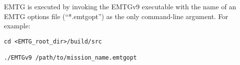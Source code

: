 
\ac{EMTG} is executed by invoking the EMTGv9 executable with the name of an \ac{EMTG} options file (``*.emtgopt'') as the only command-line argument. For example:

\begin{verbatim}
cd <EMTG_root_dir>/build/src

./EMTGv9 /path/to/mission_name.emtgopt
\end{verbatim}